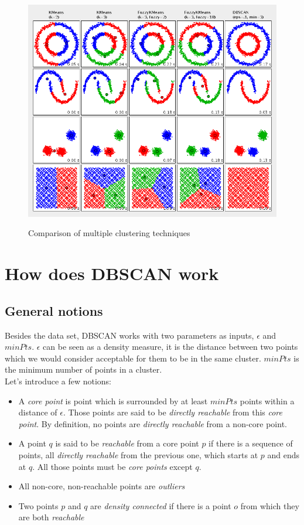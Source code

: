 \begin{figure}
\centering
{\includegraphics[width=6in]{images/cluster_comparison.png}}
\caption{Comparison of multiple clustering techniques \cite{apachecluster}}
\label{fig:clustComp}
\end{figure}

\section{How does DBSCAN work}
\subsection{General notions}
Besides the data set, DBSCAN works with two parameters as inputs, $\epsilon$ and $minPts$. $\epsilon$ can be seen as a density measure, it is the distance between two points which we would consider acceptable for them to be in the same cluster. $minPts$ is the minimum number of points in a cluster.\\
Let's introduce a few notions\cite{dbscan}:
\begin{itemize}
	\item A \emph{core point} is point which is surrounded by at least $minPts$ points within a distance of $\epsilon$. Those points are said to be \emph{directly reachable} from this \emph{core point}. By definition, no points are \emph{directly reachable} from a non-core point.
	\item A point $q$ is said to be \emph{reachable} from a core point $p$ if there is a sequence of points, all \emph{directly reachable} from the previous one, which starts at $p$ and ends at $q$. All those points must be \emph{core points} except $q$.
	\item All non-core, non-reachable points are \emph{outliers}
	\item Two points $p$ and $q$ are \emph{density connected} if there is a point $o$ from which they are both \emph{reachable}
\end{itemize}

